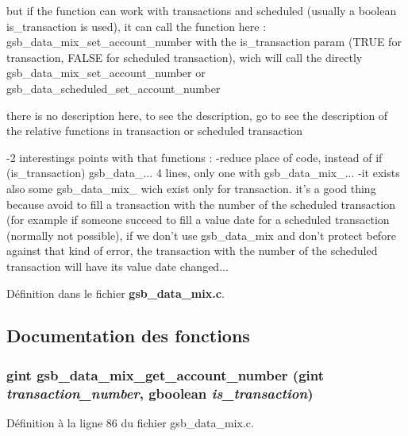 but if the function can work with transactions and scheduled (usually a boolean is\_\-transaction is used), it can call the function here : gsb\_\-data\_\-mix\_\-set\_\-account\_\-number with the is\_\-transaction param (TRUE for transaction, FALSE for scheduled transaction), wich will call the directly gsb\_\-data\_\-mix\_\-set\_\-account\_\-number or gsb\_\-data\_\-scheduled\_\-set\_\-account\_\-number

there is no description here, to see the description, go to see the description of the relative functions in transaction or scheduled transaction

-\/2 interestings points with that functions : -\/reduce place of code, instead of if (is\_\-transaction) gsb\_\-data\_\-... 4 lines, only one with gsb\_\-data\_\-mix\_\-... -\/it exists also some gsb\_\-data\_\-mix\_\- wich exist only for transaction. it's a good thing because avoid to fill a transaction with the number of the scheduled transaction (for example if someone succeed to fill a value date for a scheduled transaction (normally not possible), if we don't use gsb\_\-data\_\-mix and don't protect before against that kind of error, the transaction with the number of the scheduled transaction will have its value date changed... 

Définition dans le fichier {\bf gsb\_\-data\_\-mix.c}.



\subsection{Documentation des fonctions}
\subsubsection[{gsb\_\-data\_\-mix\_\-get\_\-account\_\-number}]{\setlength{\rightskip}{0pt plus 5cm}gint gsb\_\-data\_\-mix\_\-get\_\-account\_\-number (gint {\em transaction\_\-number}, \/  gboolean {\em is\_\-transaction})}\label{gsb__data__mix_8c_aaf2ab2d3eb0c28c8582e1099229c56fb}


Définition à la ligne 86 du fichier gsb\_\-data\_\-mix.c.

